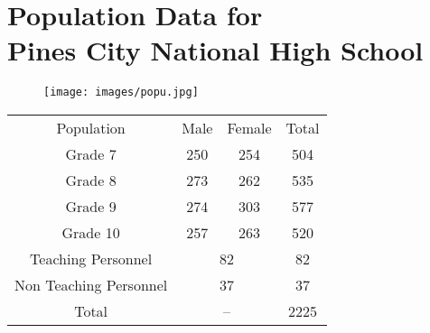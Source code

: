 \chapter{Population Data for \\ Pines City National High School }

\begin{figure}[H]
	\centering
	\texttt{[image: images/popu.jpg]}

	\label{fig:p}
\end{figure}

\begin{center}
	\begin{tabular}{|c|c|c|c|}
		\hline
		&  &  &  \\
		\hline
		Population & Male & Female & Total \\
		\hline
		Grade 7 & 250 & 254 & 504 \\
		\hline
		Grade 8 & 273 & 262 & 535 \\
		\hline
		Grade 9 & 274 & 303 & 577 \\
		\hline
		Grade 10 & 257 & 263 & 520 \\
		\hline
		Teaching Personnel & \multicolumn{2}{c|}{82} & 82 \\
		\hline
		Non Teaching Personnel & \multicolumn{2}{c|}{37} & 37 \\
		\hline
		Total & \multicolumn{2}{c|}{--} & 2225 \\
		\hline
		
	\end{tabular}
	
\end{center}
